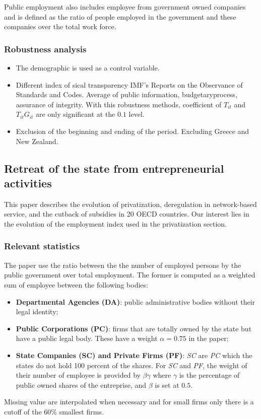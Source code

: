 Public employment also includes employee from government owned companies
and is defined as the ratio of people employed in the government and
these companies over the total work force.

\subsubsection{Robustness analysis}\label{robustness-analysis}

\begin{itemize}
\itemsep1pt\parskip0pt
\item
  The demographic is used as a control variable.
\item
  Different index of sical transparency IMF's Reports on the Observance
  of Standards and Codes. Average of public information,
  budgetaryprocess, assurance of integrity. With this robustness
  methods, coefficient of \(T_{it}\) and \(T_{it}G_{it}\) are only
  significant at the \(0.1\) level.
\item
  Exclusion of the beginning and ending of the period. Excluding Greece
  and New Zealand.
\end{itemize}

\subsection{Retreat of the state from entrepreneurial
activities}\label{retreat-of-the-state-from-entrepreneurial-activities}

This paper describes the evolution of privatization, deregulation in
network-based service, and the cutback of subsidies in 20 OECD
countries. Our interest lies in the evolution of the employment index
used in the privatization section.

\subsubsection{Relevant statistics}\label{relevant-statistics}

The paper use the ratio between the the number of employed persons by
the public government over total employment. The former is computed as a
weighted sum of employee between the following bodies:

\begin{itemize}
\itemsep1pt\parskip0pt
\item
  \textbf{Departmental Agencies (DA)}: public administrative bodies
  without their legal identity;
\item
  \textbf{Public Corporations (PC)}: firms that are totally owned by the
  state but have a public legal body. These have a weight
  \(\alpha = 0.75\) in the paper;
\item
  \textbf{State Companies (SC) and Private Firms (PF)}: \emph{SC} are
  \emph{PC} which the states do not hold 100 percent of the shares. For
  \emph{SC} and \emph{PF}, the weight of their number of employee is
  provided by \(\beta \gamma\) where \(\gamma\) is the percentage of
  public owned shares of the entreprise, and \(\beta\) is set at
  \(0.5\).
\end{itemize}

Missing value are interpolated when necessary and for small firms only
there is a cutoff of the 60\% smallest firms.

